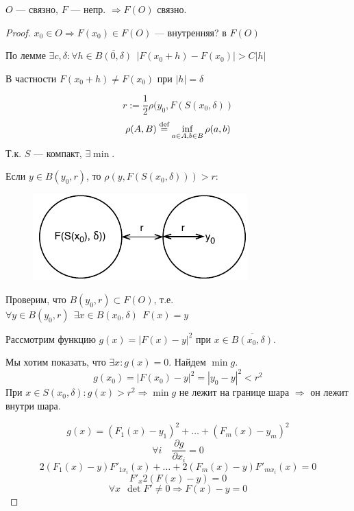 \begin{remark}
    $O$ --- связно, $F$ --- непр. $\Rightarrow F(O)$ связно.
\end{remark}

\begin{proof}
    $x_0 \in O \Rightarrow F(x_0)\in F(O)$ --- внутренняя? в $F(O)$

    По лемме $\exists c, \delta : \forall h \in \overline{B(0, \delta)} \ \ |F(x_0+h) - F(x_0)| > C|h|$

    В частности $F(x_0 + h)\not=F(x_0)$ при $|h| = \delta$

    $$r := \frac{1}{2}\rho(y_0, F(S(x_0, \delta))$$
    $$\rho(A, B) \stackrel{\text{def}}{=} \inf_{a\in A, b\in B} \rho(a, b)$$
    Т.к. $S$ --- компакт, $\exists \min$.

    Если $y\in B(y_0, r)$, то $\rho(y, F(S(x_0, \delta))) > r$:
    \begin{figure}[h]
        \includegraphics{images/осохраненииобласти.pdf}
        \centering
    \end{figure}

    \pagebreak

    Проверим, что $B(y_0, r) \subset F(O)$, т.е. $\forall y\in B(y_0, r) \ \ \exists x\in B(x_0, \delta) \ \ F(x) = y$

    Рассмотрим функцию $g(x) = |F(x) - y|^2$ при $x\in \overline{B(x_0, \delta)}$.

    Мы хотим показать, что $\exists x : g(x) = 0$. Найдем $\min g$.
    $$g(x_0) = |F(x_0) - y|^2 = |y_0 - y|^2 < r^2$$
    При $x\in S(x_0, \delta) : g(x)>r^2 \Rightarrow \min g$ не лежит на границе шара $\Rightarrow$ он лежит внутри шара.

    $$g(x) = (F_1(x) - y_1)^2 + \ldots + (F_m(x) - y_m)^2$$
    $$\forall i \quad \frac{\partial g}{\partial x_i} = 0$$
    $$2(F_1(x) - y)F'_{1x_i}(x) + \ldots + 2(F_m(x) - y)F'_{mx_i}(x) = 0$$
    $$F'_x 2(F(x) - y) = 0$$
    $$\forall x \ \ \det F'\not=0 \Rightarrow F(x) - y = 0$$
\end{proof}


